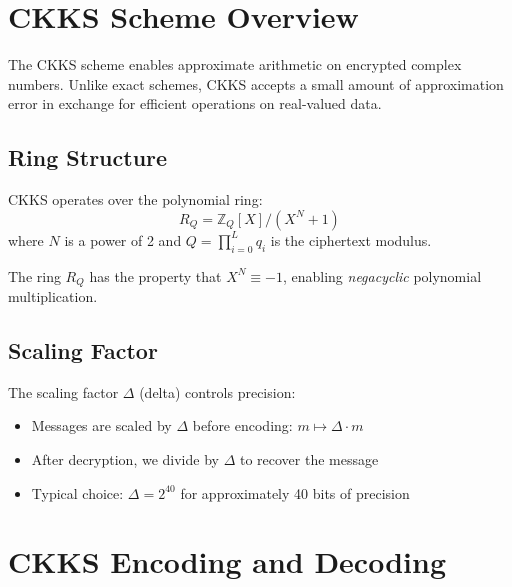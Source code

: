 \documentclass[11pt,a4paper]{article}
\newcommand{\Z}{\mathbb{Z}}
\begin{document}
\section{CKKS Scheme Overview}

The CKKS scheme enables approximate arithmetic on encrypted complex numbers. Unlike exact schemes, CKKS accepts a small amount of approximation error in exchange for efficient operations on real-valued data.

\subsection{Ring Structure}

CKKS operates over the polynomial ring:
\[
R_Q = \Z_Q[X]/(X^N + 1)
\]
where $N$ is a power of 2 and $Q = \prod_{i=0}^{L} q_i$ is the ciphertext modulus.

The ring $R_Q$ has the property that $X^N \equiv -1$, enabling \emph{negacyclic} polynomial multiplication.

\subsection{Scaling Factor}

The scaling factor $\Delta$ (delta) controls precision:
\begin{itemize}
    \item Messages are scaled by $\Delta$ before encoding: $m \mapsto \Delta \cdot m$
    \item After decryption, we divide by $\Delta$ to recover the message
    \item Typical choice: $\Delta = 2^{40}$ for approximately 40 bits of precision
\end{itemize}

\section{CKKS Encoding and Decoding}
\end{document}
